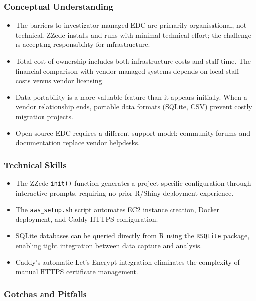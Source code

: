 \documentclass[
  letterpaper,
  DIV=11,
  numbers=noendperiod]{scrartcl}
\providecommand{\tightlist}{%
  \setlength{\itemsep}{0pt}\setlength{\parskip}{0pt}}
\begin{document}
\subsubsection{Conceptual Understanding}\label{conceptual-understanding}

\begin{itemize}
\tightlist
\item
  The barriers to investigator-managed EDC are primarily organisational,
  not technical. ZZedc installs and runs with minimal technical effort;
  the challenge is accepting responsibility for infrastructure.
\item
  Total cost of ownership includes both infrastructure costs and staff
  time. The financial comparison with vendor-managed systems depends on
  local staff costs versus vendor licensing.
\item
  Data portability is a more valuable feature than it appears initially.
  When a vendor relationship ends, portable data formats (SQLite, CSV)
  prevent costly migration projects.
\item
  Open-source EDC requires a different support model: community forums
  and documentation replace vendor helpdesks.
\end{itemize}

\subsubsection{Technical Skills}\label{technical-skills}

\begin{itemize}
\tightlist
\item
  The ZZedc \texttt{init()} function generates a project-specific
  configuration through interactive prompts, requiring no prior R/Shiny
  deployment experience.
\item
  The \texttt{aws\_setup.sh} script automates EC2 instance creation,
  Docker deployment, and Caddy HTTPS configuration.
\item
  SQLite databases can be queried directly from R using the
  \texttt{RSQLite} package, enabling tight integration between data
  capture and analysis.
\item
  Caddy's automatic Let's Encrypt integration eliminates the complexity
  of manual HTTPS certificate management.
\end{itemize}

\subsubsection{Gotchas and Pitfalls}\label{gotchas-and-pitfalls}
\end{document}
